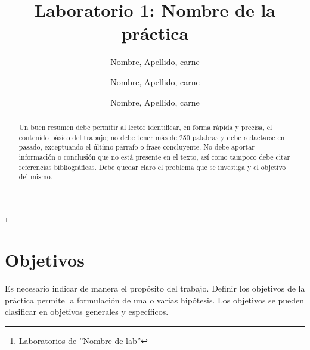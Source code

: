 \documentclass[osajnl,twocolumn,showpacs,superscriptaddress,10pt]{revtex4-1}
\begin{document}

\title{Laboratorio 1: Nombre de la práctica}
\thanks{Laboratorios de ''Nombre de lab''}

\author{Nombre, Apellido, carne}
%

\author{Nombre, Apellido, carne}
%

\author{Nombre, Apellido, carne}
%



\begin{abstract}

    Un buen resumen debe permitir al lector identificar, en forma rápida y precisa, el contenido básico del trabajo; no debe tener más de 250 palabras y debe redactarse en pasado, exceptuando el último párrafo o frase concluyente. No debe aportar información o conclusión que no está presente en el texto, así como tampoco debe citar referencias bibliográficas. Debe quedar claro el problema que se investiga y el objetivo del mismo.

\end{abstract}

\maketitle{}

\section{Objetivos}

    Es necesario indicar de manera el propósito del trabajo. Definir los objetivos de la práctica permite la formulación de una o varias hipótesis. Los objetivos se pueden clasificar en objetivos generales y específicos.
    
\end{document}
